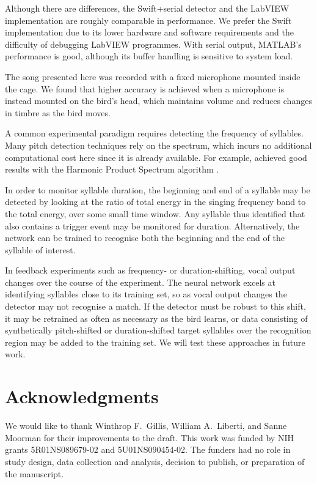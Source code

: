 \documentclass[10pt,letterpaper]{article}
\begin{document}
Although there are differences, the Swift+serial detector and the
LabVIEW implementation are roughly comparable in performance.  We
prefer the Swift implementation due to its lower hardware and software
requirements and the difficulty of debugging LabVIEW programmes.  With
serial output, MATLAB's performance is good, although its buffer
handling is sensitive to system load.

The song presented here was recorded with a fixed microphone mounted
inside the cage.  We found that higher accuracy is achieved when a
microphone is instead mounted on the bird's head, which maintains
volume and reduces changes in timbre as the bird moves.

A common experimental paradigm requires detecting the frequency of
syllables.  Many pitch detection techniques rely on the spectrum,
which incurs no additional computational cost here since it is already
available.  For example, \cite{Canopoli2014} achieved good results
with the Harmonic Product Spectrum algorithm
\cite{Noll1970pitchdetection}.

In order to monitor syllable duration, the beginning and end of a
syllable may be detected by looking at the ratio of total energy in
the singing frequency band to the total energy, over some small time
window.  Any syllable thus identified that also contains a trigger
event may be monitored for duration.  Alternatively, the network can
be trained to recognise both the beginning and the end of the syllable
of interest.

In feedback experiments such as frequency- or duration-shifting, vocal
output changes over the course of the experiment.  The neural network
excels at identifying syllables close to its training set, so as vocal
output changes the detector may not recognise a match.  If the
detector must be robust to this shift, it may be retrained as often as
necessary as the bird learns, or data consisting of synthetically
pitch-shifted or duration-shifted target syllables over the
recognition region may be added to the training set.  We will test
these approaches in future work.

\section{Acknowledgments}
We would like to thank Winthrop F.~Gillis, William A.~Liberti, and Sanne Moorman for
their improvements to the draft.  This work was funded by NIH grants
5R01NS089679-02 and 5U01NS090454-02.  The funders had no role in study design, data collection and analysis, decision to publish, or preparation of the manuscript.
\end{document}
